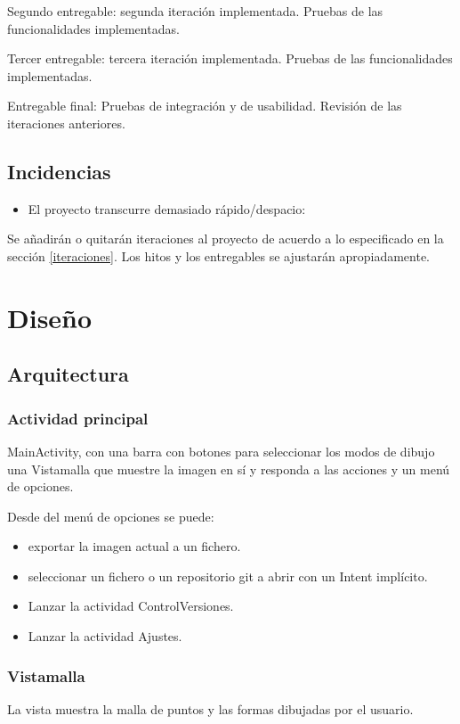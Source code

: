 \documentclass[a4paper,openright,12pt]{article}
\begin{document}
Segundo entregable: segunda iteración implementada. Pruebas de las funcionalidades implementadas.

Tercer entregable: tercera iteración implementada. Pruebas de las funcionalidades implementadas.

Entregable final: Pruebas de integración y de usabilidad. Revisión de las iteraciones anteriores.

\subsection{Incidencias}
\begin{itemize}
    \item El proyecto transcurre demasiado rápido/despacio:
\end{itemize}
Se añadirán o quitarán iteraciones al proyecto de acuerdo a lo especificado en la sección \ref{iteraciones}. Los hitos y los entregables se ajustarán apropiadamente.



\section{Diseño}
\subsection{Arquitectura}

\subsubsection{Actividad principal}
MainActivity, con una barra con botones para seleccionar los modos de dibujo una Vistamalla que muestre la imagen en sí y responda a las acciones y un menú de opciones.

Desde del menú de opciones se puede:
\begin{itemize}
	\item exportar la imagen actual a un fichero.
    \item seleccionar un fichero o un repositorio git a abrir con un Intent implícito.
    \item Lanzar la actividad ControlVersiones.
    \item Lanzar la actividad Ajustes.
\end{itemize}

\subsubsection{Vistamalla}
La vista muestra la malla de puntos y las formas dibujadas por el usuario.
\end{document}
